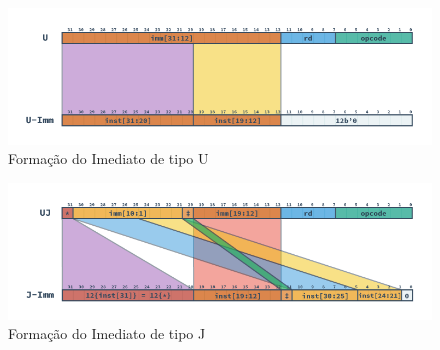 \begin{figure}[H]
\centering
    \includegraphics[width=1\linewidth]{../images/RV_U_Imm.png}
    \caption{Formação do Imediato de tipo U
        }\label{fig:riscv_u_imm}
\end{figure}

\begin{figure}[H]
\centering
    \includegraphics[width=1\linewidth]{../images/RV_J_Imm.png}
    \caption{Formação do Imediato de tipo J
        }\label{fig:riscv_j_imm}
\end{figure}



